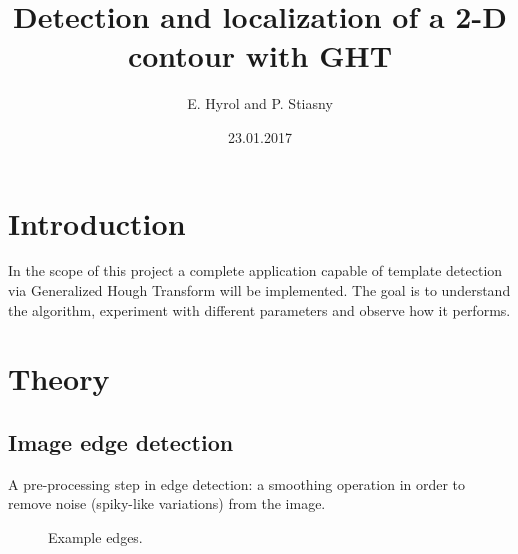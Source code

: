 \documentclass[letterpaper,12pt]{article}
\begin{document}
\title{Detection and localization of a 2-D contour with GHT}
\author{E. Hyrol and P. Stiasny}
\date{23.01.2017}
\maketitle

%


\section{Introduction}

In the scope of this project a complete application capable of template detection via Generalized Hough Transform will be implemented. The goal is to understand the algorithm, experiment with different parameters and observe how it performs.

\section{Theory}

\subsection{Image edge detection}

A pre-processing step in edge detection: a smoothing operation in order to remove noise (spiky-like variations) from the image.


\begin{figure}[!th]
  \centering
  \hfill
  \caption{Example edges.}
\end{figure}
\end{document}
